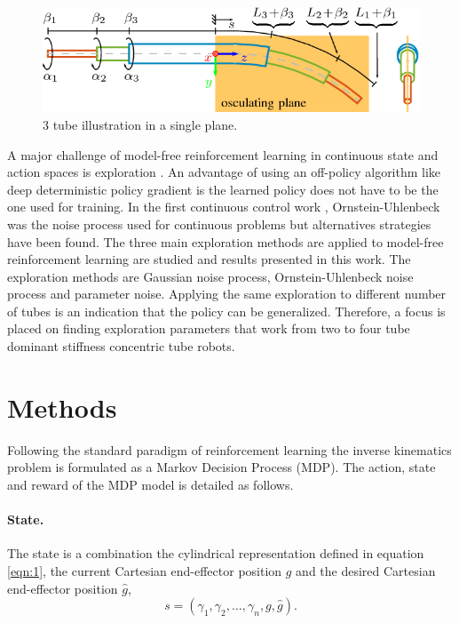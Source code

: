 \begin{figure}
  \includegraphics[scale=0.4]{images/2-Figure2-1.png}
\caption{3 tube illustration in a single plane. \cite{Grassmann2018}}
\label{fig:1}
\end{figure}

A major challenge of model-free reinforcement learning in continuous state and action spaces is exploration \cite{Nair2018}. An advantage of using an off-policy algorithm like deep deterministic policy gradient is the learned policy does not have to be the one used for training. In the first continuous control work \cite{Lillicrap2015}, Ornstein-Uhlenbeck was the noise process used for continuous problems but alternatives strategies have been found. The three main exploration methods are applied to model-free reinforcement learning are studied and results presented in this work. The exploration methods are Gaussian noise process, Ornstein-Uhlenbeck noise process and parameter noise. Applying the same exploration to different number of tubes is an indication that the policy can be generalized. Therefore, a focus is placed on finding exploration parameters that work from two to four tube dominant stiffness concentric tube robots.
\section{Methods}
Following the standard paradigm of reinforcement learning the inverse kinematics problem is formulated as a Markov Decision Process (MDP). The action, state and reward of the MDP model is detailed as follows.

\paragraph{State.} The state is a combination the cylindrical representation defined in equation \ref{eqn:1}, the current Cartesian end-effector position $g$ and the desired Cartesian end-effector position $\hat{g}$,
\begin{equation}
s = \left( \gamma_1, \gamma_2, \dots, \gamma_n, g, \hat{g} \right). \label{eqn:5}
\end{equation}

